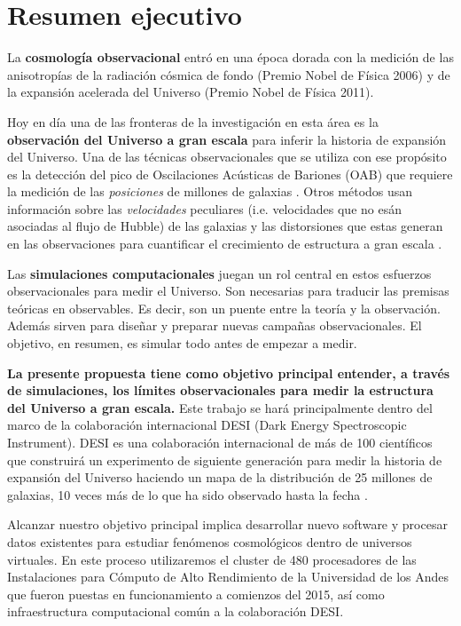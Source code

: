 
\section{Resumen ejecutivo}

La {\bf cosmología observacional} entró en una época dorada con la medición
de las anisotropías de la radiación cósmica de fondo (Premio Nobel de
Física 2006) y de la expansión acelerada del Universo
(Premio Nobel de Física 2011).  

Hoy en d\'ia una de las fronteras de la investigación en esta \'area 
es la {\bf observaci\'on del Universo a gran escala} para inferir la
historia de expansión  del Universo.   
Una de las t\'ecnicas observacionales que se utiliza con ese
prop\'osito es la detecci\'on del pico de Oscilaciones Ac\'usticas de
Bariones (OAB) que requiere la medici\'on de las \emph{posiciones} de
millones de galaxias \cite{Eisenstein2005}. 
Otros m\'etodos usan informaci\'on sobre las \emph{velocidades}
peculiares (i.e. velocidades que no es\'an asociadas al flujo de
Hubble) de las galaxias y las distorsiones que estas generan en las
observaciones para cuantificar el crecimiento de estructura a gran
escala \cite{Scoccimarro2004}. 

Las {\bf simulaciones computacionales} juegan un rol central en estos 
esfuerzos observacionales para medir el Universo.
Son necesarias para traducir las premisas te\'oricas
en observables. 
Es decir, son un puente entre la teor\'ia y la  observaci\'on. 
Adem\'as sirven para dise\~nar y preparar 
nuevas campa\~nas observacionales.  
El objetivo, en resumen, es simular todo antes de empezar a medir. 


{\bf La presente propuesta tiene como objetivo principal entender, a
  trav\'es de simulaciones, los l\'imites observacionales para 
  medir la estructura del Universo a gran escala.}
  Este trabajo se har\'a principalmente dentro del marco de la
colaboraci\'on internacional DESI (Dark Energy Spectroscopic
Instrument).  DESI es una colaboraci\'on internacional de m\'as de 100
cient\'ificos que construir\'a un experimento de siguiente
generaci\'on para medir la historia de expansi\'on del Universo
haciendo un mapa de la  distribuci\'on de 25 millones de galaxias, 10
veces m\'as de lo que ha sido observado hasta la fecha \cite{DESI}. 

Alcanzar nuestro objetivo principal implica desarrollar nuevo software
y procesar datos existentes para estudiar fen\'omenos cosmol\'ogicos 
dentro de universos virtuales.
En este proceso utilizaremos el cluster de 480 procesadores de
las Instalaciones para C\'omputo de Alto Rendimiento de  la
Universidad de los Andes que fueron puestas en funcionamiento a
comienzos del 2015, as\'i como infraestructura computacional com\'un a
la colaboraci\'on DESI.
